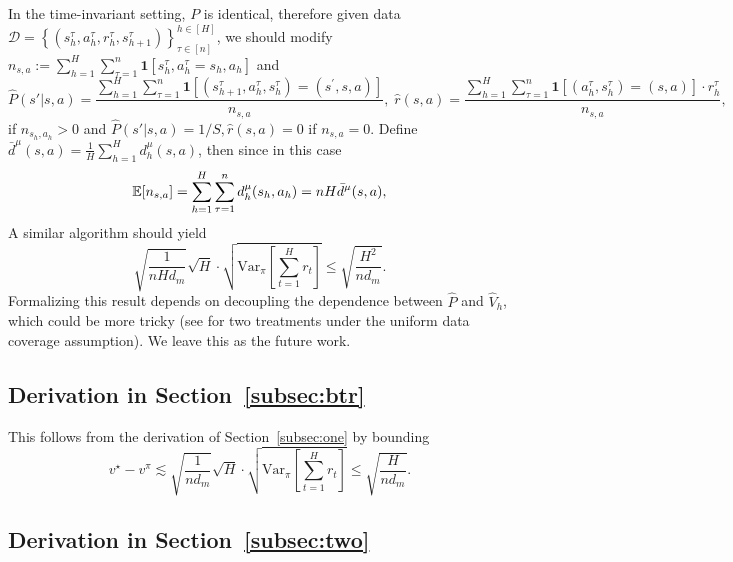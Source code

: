 In the time-invariant setting, $P$ is identical, therefore given data {\small$\mathcal{D}=\left\{\left(s_{h}^{\tau}, a_{h}^{\tau}, r_{h}^{\tau}, s_{h+1}^{\tau}\right)\right\}_{\tau\in[n]}^{h \in[H]}$}, we should modify $n_{s,a}:=\sum_{h=1}^H\sum_{\tau=1}^n\mathbf{1}[s_h^{\tau},a_h^{\tau}=s_h,a_h]$ and
{\small
	\[
	\widehat{P}(s'|s,a)=\frac{\sum_{h=1}^H\sum_{\tau=1}^n\mathbf{1}[(s^{\tau}_{h+1},a^{\tau}_h,s^{\tau}_h)=(s^\prime,s,a)]}{n_{s,a}},\; \widehat{r}(s,a)=\frac{\sum_{h=1}^H\sum_{\tau=1}^n\mathbf{1}[(a^{\tau}_h,s^{\tau}_h)=(s,a)]\cdot r_h^\tau}{n_{s,a}},
	\]
}if $n_{s_h,a_h}>0$ and $\widehat{P}(s'|s,a)={1}/{S},\widehat{r}(s,a)=0$ if $n_{s,a}=0$. Define $\bar{d}^\mu(s,a)=\frac{1}{H}\sum_{h=1}^Hd^\mu_h(s,a)$, then since in this case
\[
\mathbb{E}[n_{s,a}]=\sum_{h=1}^H\sum_{\tau=1}^nd^\mu_h(s_h,a_h)=nH\bar{d}^\mu(s,a),
\]
A similar algorithm should yield 
{\small
\[
\sqrt{\frac{1}{n H d_m}} \sqrt{H}\cdot\sqrt{\mathrm{Var}_{\pi}\left[\sum_{t=1}^{H} r_{t}\right]}\leq \sqrt{\frac{H^2}{n d_m}}.
\]
}Formalizing this result depends on decoupling the dependence between $\widehat{P}$ and $\widehat{V}_h$, which could be more tricky (see \cite{yin2021optimal,ren2021nearly} for two treatments under the uniform data coverage assumption). We leave this as the future work.




\subsection{Derivation in Section~\ref{subsec:btr}}

This follows from the derivation of Section~\ref{subsec:one} by bounding 
\[
v^\star-v^{\widehat{\pi}}\lesssim \sqrt{\frac{1}{n d_m}} \sqrt{H}\cdot\sqrt{\mathrm{Var}_{\pi}\left[\sum_{t=1}^{H} r_{t}\right]}\leq \sqrt{\frac{H}{n d_m}}.
\]

\subsection{Derivation in Section~\ref{subsec:two}}

